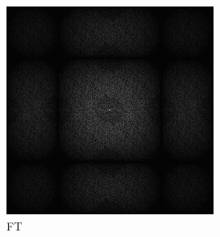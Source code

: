 \begin{figure}[H]
  \begin{tcolorbox}[boxrule=4pt,sharp corners=downhill,title=Szene unter Kamerabewegung, fonttitle=\bfseries]
    \begin{tcolorbox}[boxrule=4pt,sharp corners=downhill,title=Keine Projektion,colbacktitle=blue!50!white, coltitle=black]
    \centering
    \begin{subfigure}[b]{0.2\linewidth}
      \includegraphics[width=\linewidth]{content/TemporalerAlg/Bilder/Reprojection/NoTemporalRepr/Ausschnitte/Ausschnitt1_FFT.png}
       \caption{FT}
       \label{pic:NoTemporalRepr_1_FFT}
    \end{subfigure}
    \begin{subfigure}[b]{0.2\linewidth}

\end{subfigure}
\end{tcolorbox}
\end{tcolorbox}
\end{figure}
